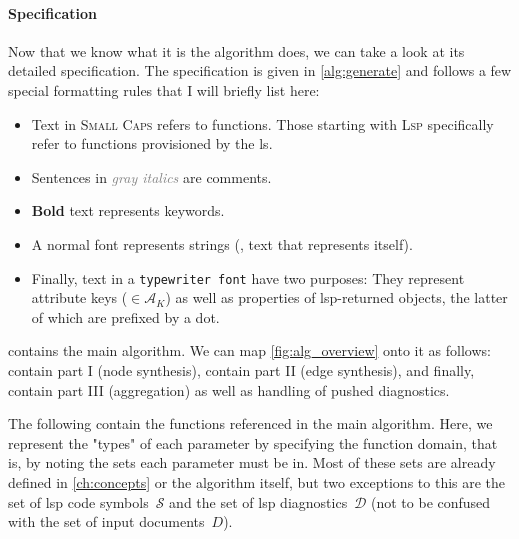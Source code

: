 \documentclass[../thesis]{subfiles}
\begin{document}
\paragraph{Specification}
Now that we know what it is the algorithm does, we can take a look at its detailed specification.
The specification is given in \cref{alg:generate} and follows a few special formatting rules that I will briefly list here:
\begin{itemize}
	\item Text in \textsc{Small Caps} refers to functions.
	      Those starting with \textsc{Lsp} specifically refer to functions provisioned by the \gls{ls}.
	\item Sentences in \textit{\textcolor{gray}{gray italics}} are comments.
	\item \textbf{Bold} text represents keywords.
	\item A normal font represents strings (\ie, text that represents itself).
	\item Finally, text in a \texttt{typewriter font} have two purposes:
	      They represent attribute keys ($\in \mathcal{A}_K$) as well as properties of \gls{lsp}-returned objects, the latter of which are prefixed by a dot.
\end{itemize}

 contains the main algorithm.
We can map \cref{fig:alg_overview} onto it as follows:
 contain part I (node synthesis),
 contain part II (edge synthesis),
and finally,  contain part III (aggregation) as well as handling of pushed diagnostics.

The following  contain the functions referenced in the main algorithm.
Here, we represent the "types" of each parameter by specifying the function domain, that is, by noting the sets each parameter must be in.
Most of these sets are already defined in \cref{ch:concepts} or the algorithm itself, but two exceptions to this are the set of \gls{lsp} code symbols~$\mathcal{S}$ and the set of \gls{lsp} diagnostics~$\mathcal{D}$ (not to be confused with the set of input documents~$D$).


\end{document}
